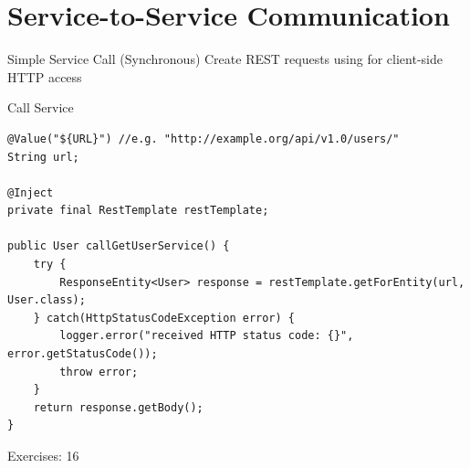 \part{Service-to-Service Communication}

\begin{frame}[fragile]{Simple Service Call (Synchronous)}
Create REST requests using  for client-side HTTP access
\begin{block}{Call Service}
\begin{lstlisting}
@Value("${URL}") //e.g. "http://example.org/api/v1.0/users/"
String url;

@Inject
private final RestTemplate restTemplate;

public User callGetUserService() {
    try {
        ResponseEntity<User> response = restTemplate.getForEntity(url, User.class);
    } catch(HttpStatusCodeException error) {
        logger.error("received HTTP status code: {}", error.getStatusCode());
        throw error;
    }
    return response.getBody();
}
\end{lstlisting}
\end{block}
\end{frame}



\begin{frame}{Exercises: 16}
\begin{figure}
	\end{figure}
\end{frame}

